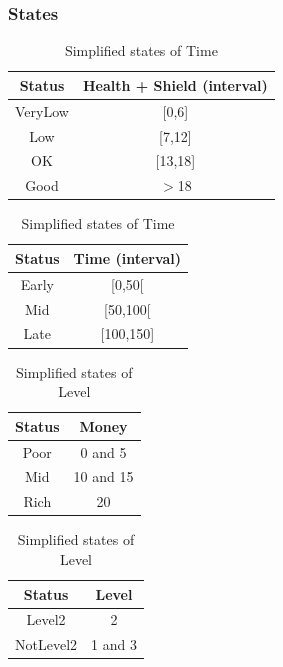 \documentclass{article}
\begin{document}
  \subsubsection{States}
  \begin{table}[h!]
      \parbox{.45\linewidth}{
        \centering
        \caption{Simplified states of Health}
        \label{tab:healthStates}
        \begin{tabular}{c|c}
          \textbf{Status} & \textbf{Health + Shield (interval)}\\
          \hline
          VeryLow & [0,6]\\
          Low & [7,12]\\
          OK & [13,18]\\
          Good & $>$18\\
        \end{tabular}
      }
      \hfil
      \parbox{.45\linewidth}{
        \centering
        \caption{Simplified states of Time}
        \label{tab:timeStates}
        \begin{tabular}{c|c}
          \textbf{Status} & \textbf{Time (interval)}\\
          \hline
          Early  & [0,50[\\
          Mid & [50,100[\\
          Late & [100,150]\\
        \end{tabular}
      }
  \end{table}
  \begin{table}[h!]
    \parbox{.45\linewidth}{
      \centering
      \caption{Simplified states of Money}
      \label{tab:moneyStates}
      \begin{tabular}{c|c}
        \textbf{Status} & \textbf{Money}\\
        \hline
        Poor & 0 and 5\\
        Mid & 10 and 15\\
        Rich & 20\\
      \end{tabular}
    }
    \hfil
    \parbox{.45\linewidth}{
      \centering
      \caption{Simplified states of Level}
      \label{tab:levelStates}
      \begin{tabular}{c|c}
        \textbf{Status} & \textbf{Level}\\
        \hline
        Level2 & 2\\
        NotLevel2 & 1 and 3\\
      \end{tabular}
    }
  \end{table}
\end{document}
